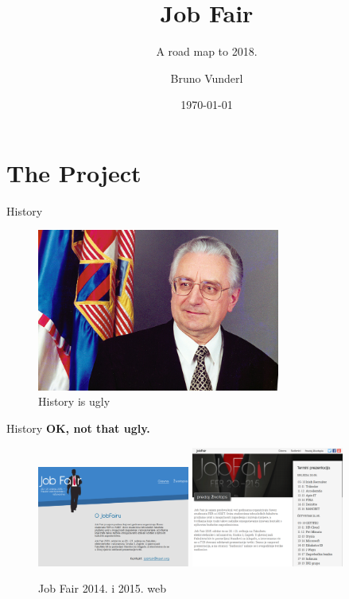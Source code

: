\documentclass{beamer}
\title{Job Fair}
\subtitle{A road map to 2018.}
\date{\today}
\author{Bruno Vunderl}
\institute{Klub studenata elektrotehnike}
\begin{document}
	\maketitle
	
	\section{The Project}
	
	\begin{frame}{History}
		\begin{figure}
			\includegraphics[width=8cm]{francek}
			\caption{History is ugly}
		\end{figure}
	\end{frame}
	
	\begin{frame}{History}
		\centering
		\textbf{OK, not that ugly.}
		\begin{figure}
			\includegraphics[width=5cm]{jf-14}
			\vspace{1cm}
			\includegraphics[width=5cm]{jf-15}
			\caption{Job Fair 2014. i 2015. web}
		\end{figure}
	\end{frame}
\end{document}

